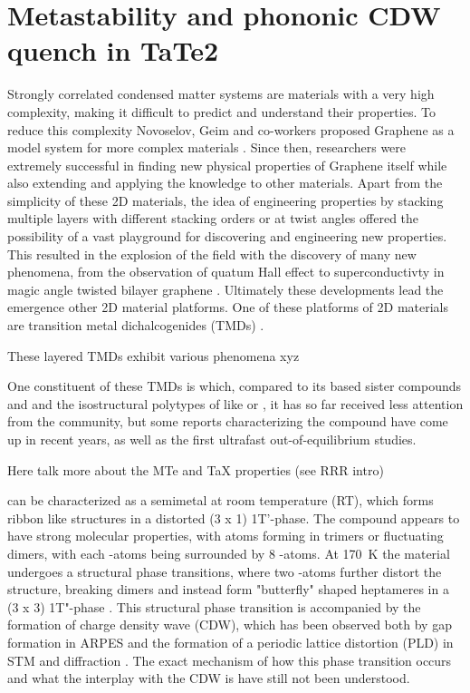 \chapter{Metastability and phononic CDW quench in TaTe2}

Strongly correlated condensed matter systems are materials with a very high complexity, making it difficult to predict and understand their properties.
To reduce this complexity Novoselov, Geim and co-workers proposed Graphene as a model system for more complex materials \cite{novoselov_electric_2004, novoselov_two-dimensional_2005, geim_rise_2007}.
Since then, researchers were extremely successful in finding new physical properties of Graphene itself while also extending and applying the knowledge to other materials.
Apart from the simplicity of these 2D materials, the idea of engineering properties by stacking multiple layers with different stacking orders or at twist angles offered the possibility of a vast playground for discovering and engineering new properties.
This resulted in the explosion of the field with the discovery of many new phenomena, from the observation of quatum Hall effect \cite{zhang_experimental_2005} to superconductivty in magic angle twisted bilayer graphene \cite{cao_unconventional_2018}.
Ultimately these developments lead the emergence other 2D material platforms.
One of these platforms of 2D materials are transition metal dichalcogenides (TMDs) \cite{butler_progress_2013, chowdhury_progress_2020, liu_van_2016}.

These layered TMDs exhibit various phenomena xyz


One constituent of these TMDs is  which, compared to its  based sister compounds  and  and the isostructural polytypes of  like  or , it has so far received less attention from the community, but some reports characterizing the compound have come up in recent years, as well as the first ultrafast out-of-equilibrium studies.

Here talk more about the MTe and TaX properties (see RRR intro)

 can be characterized as a semimetal at room temperature (RT), which forms ribbon like structures in a distorted (3 x 1) 1T'-phase.
The compound appears to have strong molecular properties, with  atoms forming in trimers or fluctuating dimers, with each -atoms being surrounded by 8 -atoms.
At \SI{170}{\kelvin} the material undergoes a structural phase transitions, where two -atoms further distort the structure, breaking dimers and instead form "butterfly" shaped heptameres in a (3 x 3) 1T"-phase \cite{feng_charge_2016, katayama_observation_2023}.
This structural phase transition is accompanied by the formation of charge density wave (CDW), which has been observed both by gap formation in ARPES \cite{lin_evidence_2022, mitsuishi_unveiling_2024} and the formation of a periodic lattice distortion (PLD) in STM and diffraction \cite{feng_charge_2016, siddiqui_ultrafast_2021, domrose_femtosecond_2024}.
The exact mechanism of how this phase transition occurs and what the interplay with the CDW is have still not been understood.

